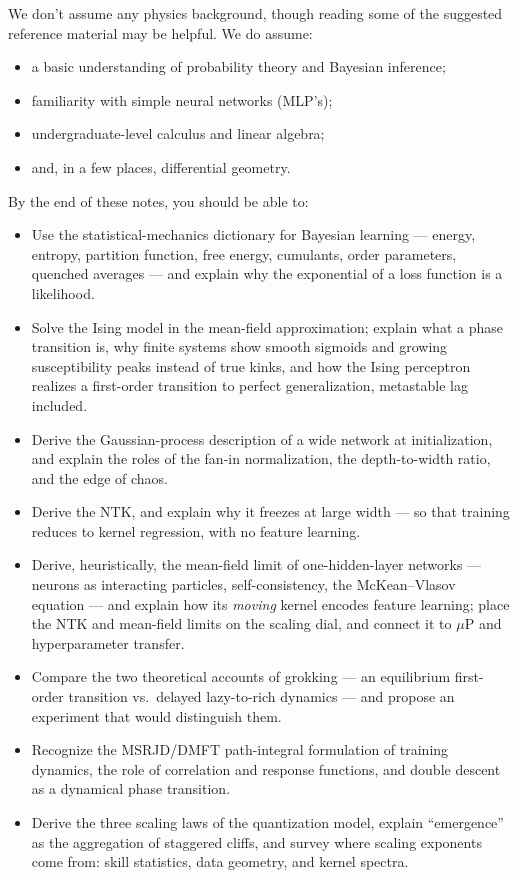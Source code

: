 \documentclass[11pt]{article}
\begin{document}
We don't assume any physics background, though reading some of the suggested
reference material may be helpful. We do assume:
\begin{itemize}
  \item a basic understanding of probability theory and Bayesian inference;
  \item familiarity with simple neural networks (MLP's);
  \item undergraduate-level calculus and linear algebra;
  \item and, in a few places, differential geometry.
\end{itemize}

\begin{learningoutcomes}
By the end of these notes, you should be able to:
\begin{itemize}
  \item Use the statistical-mechanics dictionary for Bayesian learning --- energy, entropy, partition function, free energy, cumulants, order parameters, quenched averages --- and explain why the exponential of a loss function is a likelihood.
  \item Solve the Ising model in the mean-field approximation; explain what a phase transition is, why finite systems show smooth sigmoids and growing susceptibility peaks instead of true kinks, and how the Ising perceptron realizes a first-order transition to perfect generalization, metastable lag included.
  \item Derive the Gaussian-process description of a wide network at initialization, and explain the roles of the fan-in normalization, the depth-to-width ratio, and the edge of chaos.
  \item Derive the NTK, and explain why it freezes at large width --- so that training reduces to kernel regression, with no feature learning.
  \item Derive, heuristically, the mean-field limit of one-hidden-layer networks --- neurons as interacting particles, self-consistency, the McKean--Vlasov equation --- and explain how its \emph{moving} kernel encodes feature learning; place the NTK and mean-field limits on the scaling dial, and connect it to $\mu$P and hyperparameter transfer.
  \item Compare the two theoretical accounts of grokking --- an equilibrium first-order transition vs.\ delayed lazy-to-rich dynamics --- and propose an experiment that would distinguish them.
  \item Recognize the MSRJD/DMFT path-integral formulation of training dynamics, the role of correlation and response functions, and double descent as a dynamical phase transition.
  \item Derive the three scaling laws of the quantization model, explain ``emergence'' as the aggregation of staggered cliffs, and survey where scaling exponents come from: skill statistics, data geometry, and kernel spectra.
\end{itemize}
\end{learningoutcomes}
\end{document}
